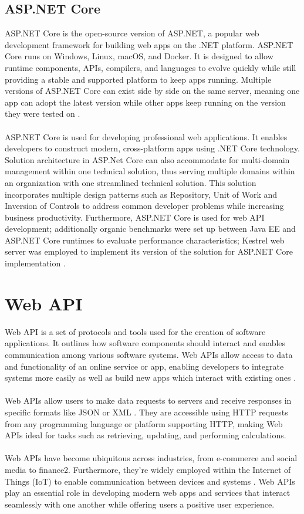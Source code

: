 \documentclass[BIF,Bachelor,nenglish]{twbook}%
\begin{document}
\subsection{ASP.NET Core}
ASP.NET Core is the open-source version of ASP.NET, a popular web development framework for building web apps on the .NET platform. ASP.NET Core runs on Windows, Linux, macOS, and Docker. It is designed to allow runtime components, APIs, compilers, and languages to evolve quickly while still providing a stable and supported platform to keep apps running. Multiple versions of ASP.NET Core can exist side by side on the same server, meaning one app can adopt the latest version while other apps keep running on the version they were tested on \cite{dotnetaspcore}.
\\
\\
ASP.NET Core is used for developing professional web applications. It enables developers to construct modern, cross-platform apps using .NET Core technology. Solution architecture in ASP.Net Core can also accommodate for multi-domain management within one technical solution, thus serving multiple domains within an organization with one streamlined technical solution. This solution incorporates multiple design patterns such as Repository, Unit of Work and Inversion of Controls to address common developer problems while increasing business productivity. Furthermore, ASP.NET Core is used for web API development; additionally organic benchmarks were set up between Java EE and ASP.NET Core runtimes to evaluate performance characteristics; Kestrel web server was employed to implement its version of the solution for ASP.NET Core implementation \cite{kro2018}.

\section{Web API}
Web API is a set of protocols and tools used for the creation of software applications. It outlines how software components should interact and enables communication among various software systems. Web APIs allow access to data and functionality of an online service or app, enabling developers to integrate systems more easily as well as build new apps which interact with existing ones \cite{soh2015}.
\\
\\
Web APIs allow users to make data requests to servers and receive responses in specific formats like JSON or XML \cite{tan2016}. They are accessible using HTTP requests from any programming language or platform supporting HTTP, making Web APIs ideal for tasks such as retrieving, updating, and performing calculations.
\\
\\
Web APIs have become ubiquitous across industries, from e-commerce and social media to finance2. Furthermore, they're widely employed within the Internet of Things (IoT) to enable communication between devices and systems \cite{tan2016}. Web APIs play an essential role in developing modern web apps and services that interact seamlessly with one another while offering users a positive user experience.
\end{document}

